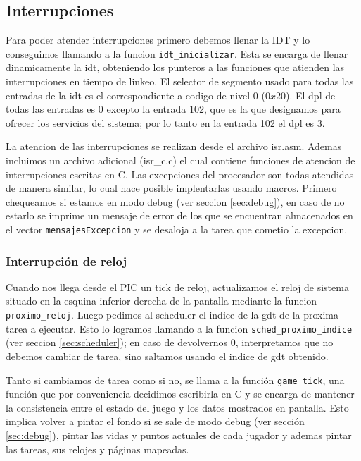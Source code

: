 \subsection{Interrupciones}

Para poder atender interrupciones primero debemos llenar la IDT y lo conseguimos llamando a la funcion \verb|idt_inicializar|. Esta se encarga de llenar dinamicamente la idt, obteniendo los punteros a las funciones que atienden las interrupciones en tiempo de linkeo. El selector de segmento usado para todas las entradas de la idt es el correspondiente a codigo de nivel 0 ($0x20$). El dpl de todas las entradas es 0 excepto la entrada 102, que es la que designamos para ofrecer los servicios del sistema; por lo tanto en la entrada 102 el dpl es 3.

La atencion de las interrupciones se realizan desde el archivo isr.asm. Ademas incluimos un archivo adicional (isr\_c.c) el cual contiene funciones de atencion de interrupciones escritas en C. 
Las excepciones del procesador son todas atendidas de manera similar, lo cual hace posible implentarlas usando macros. Primero chequeamos si estamos en modo debug (ver seccion \ref{sec:debug}), en caso de no estarlo se imprime un mensaje de error de los que se encuentran almacenados en el vector \verb|mensajesExcepcion| y se desaloja a la tarea que cometio la excepcion. 



\subsubsection{Interrupción de reloj}

\label{subsec:int-reloj}

Cuando nos llega desde el PIC un tick de reloj, actualizamos el reloj de sistema situado en la esquina inferior derecha de la pantalla mediante la funcion \verb|proximo_reloj|. Luego pedimos al scheduler el indice de la gdt de la proxima tarea a ejecutar. Esto lo logramos llamando a la funcion \verb|sched_proximo_indice| (ver seccion \ref{sec:scheduler}); en caso de devolvernos 0, interpretamos que no debemos cambiar de tarea, sino saltamos usando el indice de gdt obtenido.

Tanto si cambiamos de tarea como si no, se llama a la función \verb|game_tick|, una función que por conveniencia decidimos escribirla en C y se encarga de mantener la consistencia entre el estado del juego y los datos mostrados en pantalla. 
Esto implica volver a pintar el fondo si se sale de modo debug (ver sección \ref{sec:debug}), pintar las vidas y puntos actuales de cada jugador y ademas pintar las tareas, sus relojes y p\'aginas mapeadas.



